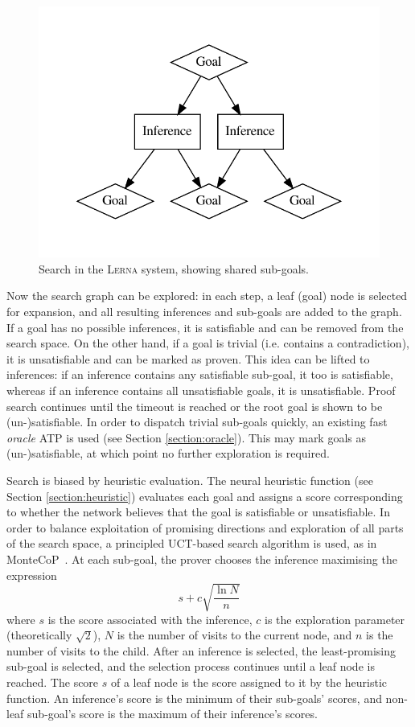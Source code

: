 \documentclass[runningheads]{llncs}
\newcommand{\lerna}{\textsc{Lerna}}
\begin{document}
\begin{figure}
	\centering
	\includegraphics[width=0.6\linewidth]{search}
	\caption{Search in the \lerna{} system, showing shared sub-goals.}
\end{figure}

Now the search graph can be explored: in each step, a leaf (goal) node is selected for expansion, and all resulting inferences and sub-goals are added to the graph.
If a goal has no possible inferences, it is satisfiable and can be removed from the search space.
On the other hand, if a goal is trivial (i.e. contains a contradiction), it is unsatisfiable and can be marked as proven.
This idea can be lifted to inferences: if an inference contains any satisfiable sub-goal, it too is satisfiable, whereas if an inference contains all unsatisfiable goals, it is unsatisfiable.
Proof search continues until the timeout is reached or the root goal is shown to be (un-)satisfiable.
In order to dispatch trivial sub-goals quickly, an existing fast \emph{oracle} ATP is used (see Section \ref{section:oracle}).
This may mark goals as (un-)satisfiable, at which point no further exploration is required.

Search is biased by heuristic evaluation.
The neural heuristic function (see Section \ref{section:heuristic}) evaluates each goal and assigns a score corresponding to whether the network believes that the goal is satisfiable or unsatisfiable.
In order to balance exploitation of promising directions and exploration of all parts of the search space, a principled UCT-based search algorithm is used, as in MonteCoP~\cite{MonteCoP}.
At each sub-goal, the prover chooses the inference maximising the expression
\[
	s + c\sqrt{\frac{\ln N}{n}}
\]
where \(s\) is the score associated with the inference, \(c\) is the exploration parameter (theoretically \(\sqrt{2}\)), \(N\) is the number of visits to the current node, and \(n\) is the number of visits to the child.
After an inference is selected, the least-promising sub-goal is selected, and the selection process continues until a leaf node is reached.
The score \(s\) of a leaf node is the score assigned to it by the heuristic function.
An inference's score is the minimum of their sub-goals' scores, and non-leaf sub-goal's score is the maximum of their inference's scores.
\end{document}

